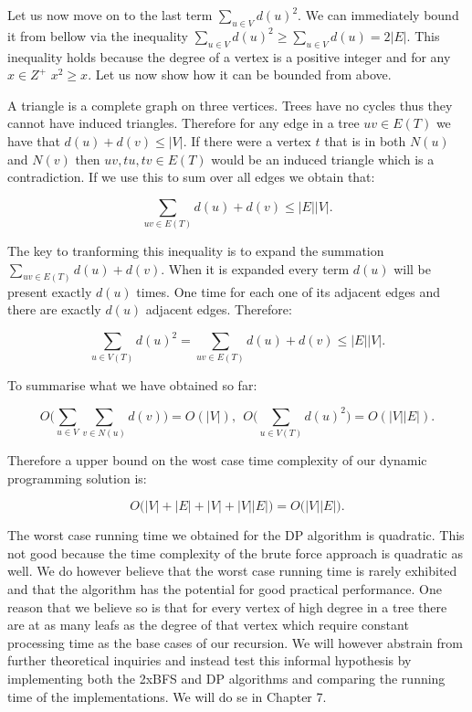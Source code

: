 Let us now move on to the last term $\sum_{u \in V}{d(u)^2}$. We can immediately bound it from bellow via the inequality $ \sum_{u \in V}{d(u)^2} \ge \sum_{u \in V}{d(u)} = 2|E|$. This inequality holds because the degree of a vertex is a positive integer and for any $x \in Z^+$ $ x^2 \ge x$. Let us now show how it can be bounded from above.

A triangle is a complete graph on three vertices. Trees have no cycles thus they cannot have induced triangles. Therefore for any edge in a tree $uv \in E(T)$ we have that $d(u) + d(v) \le |V|$. If there were a vertex $t$ that is in both $N(u)$ and $N(v)$ then $uv, tu, tv \in E(T)$ would be an induced triangle which is a contradiction. If we use this to sum over all edges we obtain that:

$$ \sum_{uv \in E(T)}{d(u) + d(v)} \le |E||V|. $$

The key to tranforming this inequality is to expand the summation $\sum_{uv \in E(T)}{d(u) + d(v)}$. When it is expanded every term $d(u)$ will be present exactly $d(u)$ times. One time for each one of its adjacent edges and there are exactly $d(u)$ adjacent edges. Therefore:

$$ \sum_{u \in V(T)}{d(u)^2} = \sum_{uv \in E(T)}{d(u) + d(v)} \le |E||V| .$$

To summarise what we have obtained so far:

$$ O\bigg( \sum_{u \in V}{\sum_{v \in N(u)}{d(v)}} \bigg) = O(|V|)  , ~~ O\bigg( \sum_{u \in V(T)}{d(u)^2} \bigg) = O(|V||E|).$$

Therefore a upper bound on the wost case time complexity of our dynamic programming solution is:

$$ O\big( |V| + |E| + |V| + |V||E|  \big) = O\big(|V||E|\big).$$

The worst case running time we obtained for the DP algorithm is quadratic. This not good because the time complexity of the brute force approach is quadratic as well. We do however believe that the worst case running time is rarely exhibited and that the algorithm has the potential for good practical performance. One reason that we believe so is that for every vertex of high degree in a tree there are at as many leafs as the degree of that vertex which require constant processing time as the base cases of our recursion. We will however abstrain from further theoretical inquiries and instead test this informal hypothesis by implementing both the 2xBFS and DP algorithms and comparing the running time of the implementations. We will do se in Chapter 7.

